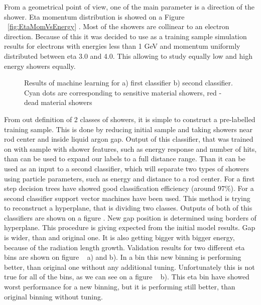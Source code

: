 From a geometrical point of view, one of the main parameter is a direction of the shower. Eta momentum distribution is showed on a Figure ~\ref{fig:EtaMomVsEnergy} . Most of the showers are collinear to an electron direction. Because of this it was decided to use as a training sample simulation results for electrons with energies less than 1 GeV and momentum uniformly distributed between eta 3.0 and 4.0. This allowing to study equally low and high energy showers equally.

\begin{figure}[h]
\begin{minipage}[h]{0.49\linewidth}
\end{minipage}
\hfill
\begin{minipage}[h]{0.49\linewidth}
\end{minipage}
\caption{Results of machine learning for a) first classifier b) second classifier. Cyan dots are corresponding to sensitive material showers, red - dead material showers}
\label{fig:Class}
\end{figure}


From out definition of 2 classes of showers, it is simple to construct a pre-labelled training sample. This is done by reducing initial sample and taking showers near rod center and inside liquid argon gap. Output of this classifier, that was trained on with sample with shower features, such as energy response and number of hits, than can be used to expand our labels to a full distance range. Than it can be used as an input to a second classifier, which will separate two types of showers using particle parameters, such as energy and distance to a rod center. For a first step decision trees have showed good classification efficiency (around 97\%). For a second classifier support vector machines have been used. This method is trying to reconstruct a hyperplane, that is dividing two classes. Outputs of both of this classifiers are shown on a figure . New gap position is determined using borders of hyperplane. This procedure is giving expected from the initial model results. Gap is wider, than and original one. It is also getting bigger with bigger energy, because of the radiation length growth. 
Validation results for two different eta bins are shown on figure ~ a) and b). In a bin this new binning is performing better, than original one without any additional tuning. Unfortunately this is not true for all of the bins, as we can see on a figure ~ b). This eta bin have showed worst performance for a new binning, but it is performing still better, than original binning without tuning.


